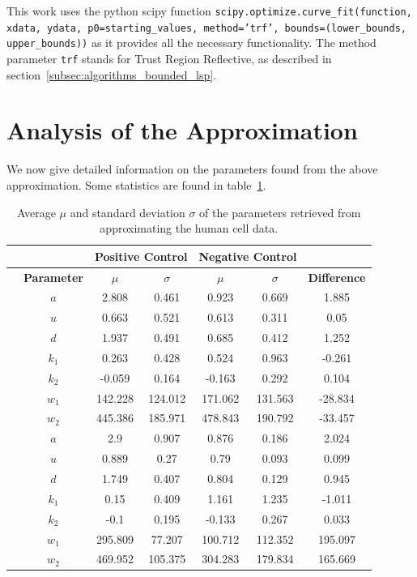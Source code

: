 This work uses the python scipy function \texttt{scipy.optimize.curve\_fit(function,\\ xdata, ydata, p0=starting\_values, method='trf', bounds=(lower\_bounds,\\ upper\_bounds))} as it provides all the necessary functionality. The method parameter \texttt{trf} stands for Trust Region Reflective, as described in section~\ref{subsec:algorithms_bounded_lsp}.

\section{Analysis of the Approximation}
\label{sec:analysis_of_approximation}

We now give detailed information on the parameters found from the above approximation. Some statistics are found in table~\ref{tab:statistics_parameters}.

\begin{table}[h!]
	\centering
	\begin{tabular}{|c|c|c|c|c|c|c|}
		\hline
		& & \multicolumn{2}{c|}{\textbf{Positive Control}} & \multicolumn{2}{c|}{\textbf{Negative Control}} & \\ 
		\hline
		& \textbf{Parameter} & $\mu$ & $\sigma$ & $\mu$ & $\sigma$ & \textbf{Difference} \\ 
		\hline
		\hline
		\multirow{7}{*}{\rotatebox[origin=c]{90}{\textbf{human cells}}} & $a$ & 2.808 & 0.461 & 0.923 & 0.669 & 1.885\\
		\cline{2-7}
		& $u$ & 0.663 & 0.521 & 0.613 & 0.311 & 0.05\\
		\cline{2-7}
		& $d$ & 1.937 & 0.491 & 0.685 & 0.412 & 1.252\\
		\cline{2-7}
		& $k_1$ & 0.263 & 0.428 & 0.524 & 0.963 & -0.261 \\
		\cline{2-7}
		& $k_2$ & -0.059 & 0.164 & -0.163 & 0.292 & 0.104 \\
		\cline{2-7}
		& $w_1$ & 142.228 & 124.012 & 171.062 & 131.563 & -28.834 \\
		\cline{2-7}
		& $w_2$ & 445.386 & 185.971 & 478.843 & 190.792 & -33.457 \\
		\hline
		\hline
		\multirow{7}{*}{\rotatebox[origin=c]{90}{\textbf{mouse cells}}} & $a$ & 2.9 & 0.907 & 0.876 & 0.186 & 2.024 \\
		\cline{2-7}
		& $u$ & 0.889 & 0.27 & 0.79 & 0.093 & 0.099 \\
		\cline{2-7}
		& $d$ & 1.749 & 0.407 & 0.804 & 0.129 & 0.945 \\
		\cline{2-7}
		& $k_1$ & 0.15 & 0.409 & 1.161 & 1.235 & -1.011 \\
		\cline{2-7}
		& $k_2$ & -0.1 & 0.195 & -0.133 & 0.267 & 0.033 \\
		\cline{2-7}
		& $w_1$ & 295.809 & 77.207 & 100.712 & 112.352 & 195.097 \\
		\cline{2-7}
		& $w_2$ & 469.952 & 105.375 & 304.283 & 179.834 & 165.669 \\
		\hline
	\end{tabular}
	\caption{Average $\mu$ and standard deviation $\sigma$ of the parameters retrieved from approximating the human cell data.}
	\label{tab:statistics_parameters}
\end{table}

